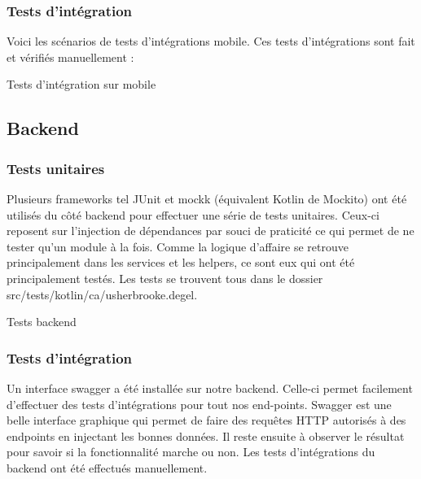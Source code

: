         \subsubsection{Tests d'intégration}
        Voici les scénarios de tests d'intégrations mobile. Ces tests d'intégrations sont fait et vérifiés manuellement :

        \begin{table}[hp]
            \centering
            \caption{Tests d'intégration sur mobile}
            
            \label{tab.testsIntegrationMobile}
        \end{table}
                
    \subsection{Backend}

        \subsubsection{Tests unitaires}
        Plusieurs frameworks tel JUnit et mockk (équivalent Kotlin de Mockito) ont été utilisés du côté backend pour effectuer une série de tests unitaires. Ceux-ci reposent sur l'injection de dépendances par souci de praticité ce qui permet de ne tester qu'un module à la fois. Comme la logique d'affaire se retrouve principalement dans les services et les helpers, ce sont eux qui ont été principalement testés. Les tests se trouvent tous dans le dossier  src/tests/kotlin/ca/usherbrooke.degel.

        \begin{table}[hp]
            \centering
            \caption{Tests backend}
            
            \label{tab.testsBackend}
        \end{table}
        
        \subsubsection{Tests d'intégration}
        Un interface swagger a été installée sur notre backend. Celle-ci permet facilement d'effectuer des tests d'intégrations pour tout nos end-points. Swagger est une belle interface graphique qui permet de faire des requêtes HTTP autorisés à des endpoints en injectant les bonnes données. Il reste ensuite à observer le résultat pour savoir si la fonctionnalité marche ou non. Les tests d'intégrations du backend ont été effectués manuellement.
        
